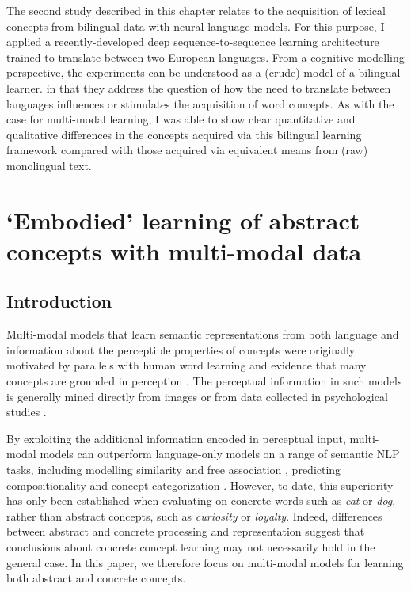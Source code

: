 The second study described in this chapter relates to the acquisition of lexical concepts from bilingual data with neural language models. For this purpose, I applied a recently-developed deep sequence-to-sequence learning architecture trained to translate between two European languages. From a cognitive modelling perspective, the experiments can be understood as a (crude) model of a bilingual learner. in that they address the question of how the need to translate between languages influences or stimulates the acquisition of word concepts. As with the case for multi-modal learning, I was able to show clear quantitative and qualitative differences in the concepts acquired via this bilingual learning framework compared with those acquired via equivalent means from (raw) monolingual text. 

\section{`Embodied' learning of abstract concepts with multi-modal data}

\subsection{Introduction}

Multi-modal models that learn semantic representations from both language and information about the perceptible properties of concepts were originally motivated by parallels with human word learning \cite{andrews2009integrating} and evidence that many concepts are grounded in perception \cite{barsalou2005situating}. The perceptual information in such models is generally mined directly from images \cite{feng2010visual,bruni2012distributional} or from data collected in psychological studies \cite{silberer2012grounded,rollermultimodal}. 

By exploiting the additional information encoded in perceptual input, multi-modal models can outperform language-only models on a range of semantic NLP tasks, including modelling similarity \cite{bruni2014multimodal} and free association \cite{silberer2012grounded}, predicting compositionality \cite{rollermultimodal} and concept categorization \cite{silberer2014learning}. However, to date, this superiority has only been established when evaluating on concrete words such as \emph{cat} or \emph{dog}, rather than abstract concepts, such as \emph{curiosity} or \emph{loyalty}. Indeed, differences between abstract and concrete processing and representation \cite{paivio1991dual,hill2013quantitative} suggest that conclusions about concrete concept learning may not necessarily hold in the general case. In this paper, we therefore focus on multi-modal models for learning both abstract and concrete concepts.

